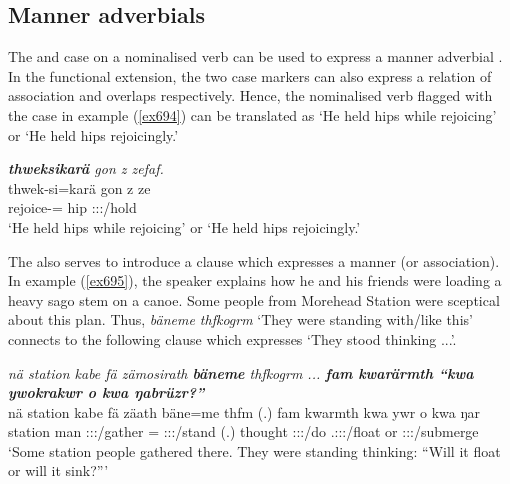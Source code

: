 \subsection{Manner adverbials}\label{manneradv}

The  and  case on a nominalised verb can be used to express a manner adverbial . In the functional extension, the two case markers can also express a relation of association and  overlaps respectively. Hence, the nominalised verb flagged with the  case in example (\ref{ex694}) can be translated as `He held hips while rejoicing' or `He held hips rejoicingly.'

\begin{exe}
	\ex \emph{\textbf{thweksikarä} gon z zefaf.}\\
	\gll thwek-si=karä gon z ze\\
	rejoice-\Nmlz={\Prop} hip {\Iam} \Stsg:\Sbj:\Rpst:\Pfv/hold\\
	\trans `He held hips while rejoicing' or `He held hips rejoicingly.'
	\label{ex694}
\end{exe}

The   also serves to introduce a clause which expresses a manner (or  association). In example (\ref{ex695}), the speaker explains how he and his friends were loading a heavy sago stem on a canoe. Some people from Morehead Station were sceptical about this plan. Thus, \emph{bäneme thfkogrm} `They were standing with/like this' connects to the following clause which expresses `They stood thinking ...'.

\begin{exe}
	\ex \emph{nä station kabe fä zämosirath \textbf{bäneme} thfkogrm ... \textbf{fam kwarärmth ``kwa ywokrakwr o kwa ŋabrüzr?''}}\\
	\gll nä station kabe fä zäath bäne=me thfm (.) fam kwarmth kwa ywr o kwa ŋar\\
	{\Indf} station man {\Dist} \Stpl:\Sbj:\Pst:\Pfv/gather \Recog={\Ins} \Stpl:\Sbj:\Pst:\Dur/stand (.) thought \Stpl:\Sbj:\Pst:\Dur/do {\Fut} \Tsg.\Masc:\Sbj:\Nonpast:\Ipfv/float or {\Fut} \Stsg:\Sbj:\Nonpast:\Ipfv/submerge\\
	\trans `Some station people gathered there. They were standing thinking: ``Will it float or will it sink?'''
	\label{ex695}
\end{exe}

